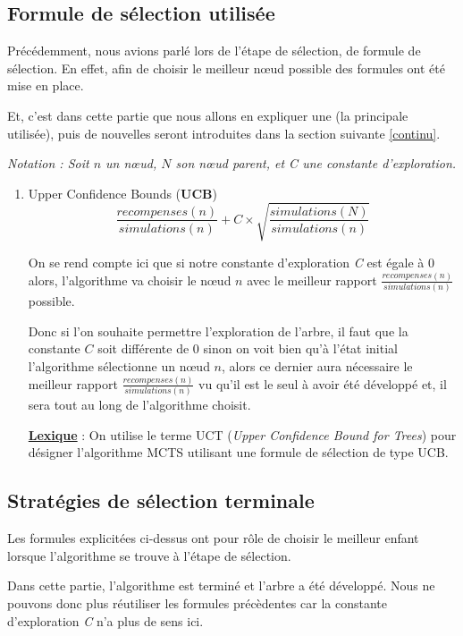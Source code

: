 \documentclass[pdftex,french, english]{article}	%
\begin{document}
    
	\subsection{Formule de sélection utilisée} \label{selection}
	Précédemment, nous avions parlé lors de l'étape de sélection, de formule de sélection. 
	En effet, afin de choisir le meilleur nœud possible des formules ont été mise en place.


	Et, c'est dans cette partie que nous allons en expliquer une (la principale utilisée), puis de nouvelles seront introduites
	dans la section suivante \ref{continu}.

	\textit{Notation : Soit $n$ un nœud, $N$ son nœud parent, et C une constante d'exploration.} 

	\begin{enumerate}
		\item Upper Confidence Bounds (\textbf{UCB}) \\
		\[ \frac{recompenses(n)}{simulations(n)} + C \times \sqrt{\frac{simulations(N)}{simulations(n)}} \] 

		On se rend compte ici que si notre constante d'exploration \textit{C} est égale à $0$ alors, l'algorithme va choisir le nœud $n$ avec le meilleur rapport $\frac{recompenses(n)}{simulations(n)}$ possible. 

		Donc si l'on souhaite permettre l'exploration de l'arbre, il faut que la constante $C$ soit différente de $0$ sinon on voit bien qu'à l'état initial l'algorithme sélectionne un nœud $n$, alors ce dernier aura nécessaire le meilleur rapport $\frac{recompenses(n)}{simulations(n)}$ vu qu'il est le seul à avoir été développé et,  il sera tout au long de l'algorithme choisit. 


		\underline{\textbf{Lexique}} : On utilise le terme UCT (\textit{Upper Confidence Bound for Trees}) pour désigner l'algorithme MCTS utilisant une formule de sélection de type UCB.
	\end{enumerate}





	\subsection{Stratégies de sélection terminale}
	Les formules explicitées ci-dessus ont pour rôle de choisir le meilleur enfant lorsque l'algorithme se trouve à l'étape de sélection. 

	Dans cette partie, l'algorithme est terminé et l'arbre a été développé. Nous ne pouvons donc plus réutiliser les formules précèdentes car la constante d'exploration \textit{C} n'a plus de sens ici. 
\end{document}
